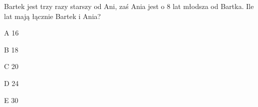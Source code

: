 \begin{tresc}
Bartek jest trzy razy starszy od Ani, zaś Ania jest o 8 lat młodsza od Bartka. Ile lat mają łącznie Bartek i Ania?
\end{tresc}
\begin{wariant}{A} 16 \end{wariant}
\begin{wariant}{B} 18 \end{wariant}
\begin{wariant}{C} 20 \end{wariant}
\begin{wariant}{D} 24 \end{wariant}
\begin{wariant}{E} 30 \end{wariant}
